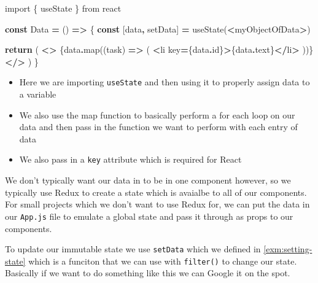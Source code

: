 \documentclass[
]{report}
\newenvironment{Shaded}{\begin{snugshade}}{\end{snugshade}}
\newcommand{\AttributeTok}[1]{\textcolor[rgb]{0.77,0.63,0.00}{#1}}
\newcommand{\ControlFlowTok}[1]{\textcolor[rgb]{0.13,0.29,0.53}{\textbf{#1}}}
\newcommand{\FunctionTok}[1]{\textcolor[rgb]{0.00,0.00,0.00}{#1}}
\newcommand{\ImportTok}[1]{#1}
\newcommand{\KeywordTok}[1]{\textcolor[rgb]{0.13,0.29,0.53}{\textbf{#1}}}
\newcommand{\NormalTok}[1]{#1}
\newcommand{\OperatorTok}[1]{\textcolor[rgb]{0.81,0.36,0.00}{\textbf{#1}}}
\newcommand{\StringTok}[1]{\textcolor[rgb]{0.31,0.60,0.02}{#1}}
\providecommand{\tightlist}{%
  \setlength{\itemsep}{0pt}\setlength{\parskip}{0pt}}
\theoremstyle{definition}
\theoremstyle{definition}
\theoremstyle{definition}
\theoremstyle{definition}
\theoremstyle{remark}
\begin{document}
\begin{Shaded}
\begin{Highlighting}[]
\ImportTok{import}\NormalTok{ \{ useState \} }\ImportTok{from} \StringTok{\textquotesingle{}react\textquotesingle{}}

\KeywordTok{const}\NormalTok{ Data }\OperatorTok{=}\NormalTok{ () }\KeywordTok{=\textgreater{}}\NormalTok{ \{}
    \KeywordTok{const}\NormalTok{ [data}\OperatorTok{,}\NormalTok{ setData] }\OperatorTok{=} \FunctionTok{useState}\NormalTok{(}\OperatorTok{\textless{}}\NormalTok{myObjectOfData}\OperatorTok{\textgreater{}}\NormalTok{)}
    
    \ControlFlowTok{return}\NormalTok{ (}
        \OperatorTok{\textless{}\textgreater{}}
\NormalTok{            \{data}\OperatorTok{.}\FunctionTok{map}\NormalTok{((task) }\KeywordTok{=\textgreater{}}\NormalTok{ (}
                \OperatorTok{\textless{}}\NormalTok{li key}\OperatorTok{=}\NormalTok{\{data}\OperatorTok{.}\AttributeTok{id}\NormalTok{\}}\OperatorTok{\textgreater{}}\NormalTok{\{data}\OperatorTok{.}\AttributeTok{text}\NormalTok{\}}\OperatorTok{\textless{}/}\NormalTok{li}\OperatorTok{\textgreater{}}
\NormalTok{            ))\}}
        \OperatorTok{\textless{}/\textgreater{}}
\NormalTok{    )}
\NormalTok{\}}
\end{Highlighting}
\end{Shaded}

\begin{itemize}
\tightlist
\item
  Here we are importing \texttt{useState} and then using it to properly assign data to a variable
\item
  We also use the map function to basically perform a for each loop on our data and then pass in the function we want to perform with each entry of data
\item
  We also pass in a \texttt{key} attribute which is required for React
\end{itemize}

We don't typically want our data in to be in one component however, so we typically use Redux to create a state which is avaialbe to all of our components. For small projects which we don't want to use Redux for, we can put the data in our \texttt{App.js} file to emulate a global state and pass it through as props to our components.

To update our immutable state we use \texttt{setData} which we defined in \ref{exm:setting-state} which is a funciton that we can use with \texttt{filter()} to change our state. Basically if we want to do something like this we can Google it on the spot.
\end{document}
